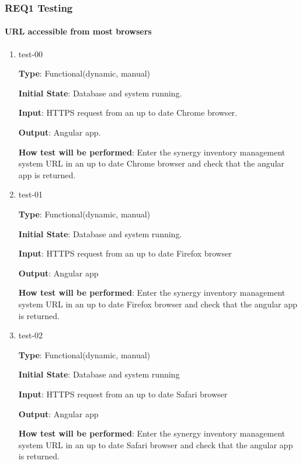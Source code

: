 \documentclass[12pt, titlepage]{article}
\begin{document}
\subsubsection{REQ1 Testing}
		
\paragraph{URL accessible from most browsers}

\begin{enumerate}
\item{test-00\\}

\textbf{Type}: Functional(dynamic, manual)
					
\textbf{Initial State}: Database and system running.
					
\textbf{Input}: HTTPS request from an up to date Chrome browser.
					
\textbf{Output}: Angular app.
					
\textbf{How test will be performed}: Enter the synergy inventory management system URL in an up to date Chrome browser and check that the angular app is returned.
					
\item{test-01\\}    

\textbf{Type}: Functional(dynamic, manual)
					
\textbf{Initial State}: Database and system running.
					
\textbf{Input}: HTTPS request from an up to date Firefox browser
					
\textbf{Output}: Angular app
					
\textbf{How test will be performed}:  Enter the synergy inventory management system URL in an up to date Firefox browser and check that the angular app is returned.

\item{test-02\\}

\textbf{Type}: Functional(dynamic, manual)
					
\textbf{Initial State}: Database and system running
					
\textbf{Input}: HTTPS request from an up to date Safari browser
					
\textbf{Output}: Angular app
					
\textbf{How test will be performed}: Enter the synergy inventory management system URL in an up to date Safari browser and check that the angular app is returned.


\end{enumerate}
\end{document}
